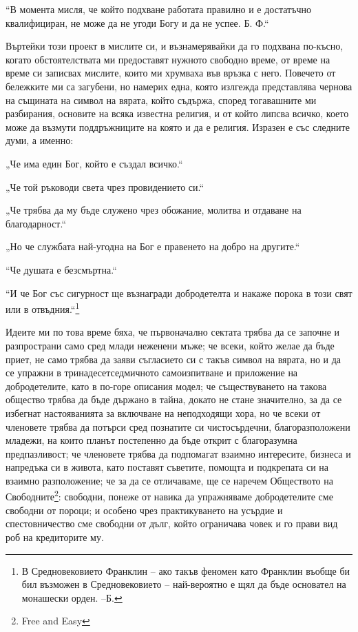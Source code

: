 \documentclass[12pt]{book}
\begin{document}
“В момента мисля, че който подхване работата правилно и е достатъчно квалифициран, не може да не угоди Богу и да не успее. 
Б. Ф.“

Въртейки този проект в мислите си, и възнамерявайки да го подхвана по-късно, когато обстоятелствата ми предоставят нужното свободно време, от време на време си записвах мислите, които ми хрумваха във връзка с него. Повечето от бележките ми са загубени, но намерих една, която излгежда представлява чернова на същината на символ на вярата, който съдържа, според тогавашните ми разбирания, основите на всяка известна религия, и от който липсва всичко, което може да възмути поддръжниците на която и да е религия. Изразен е със следните думи, а именно:

„Че има един Бог, който е създал всичко.“

„Че той ръководи света чрез провидението си.“

„Че трябва да му бъде служено чрез обожание, молитва и отдаване на благодарност.“

„Но че службата най-угодна на Бог е правенето на добро на другите.“

“Че душата е безсмъртна.“

“И че Бог със сигурност ще възнагради добродетелта и накаже порока в този свят или в отвъдния.“\footnote{В Средновековието Франклин – ако такъв феномен като Франклин въобще би бил възможен в Средновековието – най-вероятно е щял да бъде основател на монашески орден. --Б.}

Идеите ми по това време бяха, че първоначално сектата трябва да се започне и разпространи само сред млади неженени мъже; че всеки, който желае да бъде приет, не само трябва да заяви съгласието си с такъв символ на вярата, но и да се упражни в тринадесетседмичното самоизпитване и приложение на добродетелите, като в по-горе описания модел; че съществуването на такова общество трябва да бъде държано в тайна, докато не стане значително, за да се избегнат настояванията за включване на неподходящи хора, но че всеки от членовете трябва да потърси сред познатите си чистосърдечни, благоразположени младежи, на които планът постепенно да бъде открит с благоразумна предпазливост; че членовете трябва да подпомагат взаимно интересите, бизнеса и напредъка си в живота, като поставят съветите, помощта и подкрепата си на взаимно разположение; че за да се отличаваме, ще се наречем Обществото на Свободните\footnote{Free and Easy}: свободни, понеже от навика да упражняваме добродетелите сме свободни от пороци; и особено чрез практикуването на усърдие и спестовничество сме свободни от дълг, който ограничава човек и го прави вид роб на кредиторите му. 
\end{document}
